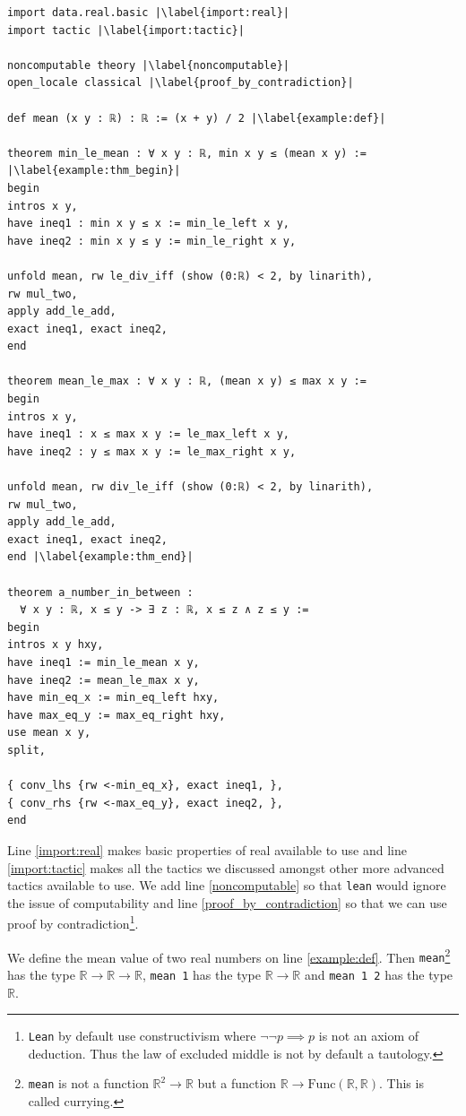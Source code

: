 \documentclass{report}
\theoremstyle{definition}
\begin{document}
\begin{verbatim}
import data.real.basic |\label{import:real}|
import tactic |\label{import:tactic}|
  
noncomputable theory |\label{noncomputable}|
open_locale classical |\label{proof_by_contradiction}|  

def mean (x y : ℝ) : ℝ := (x + y) / 2 |\label{example:def}|
  
theorem min_le_mean : ∀ x y : ℝ, min x y ≤ (mean x y) := |\label{example:thm_begin}|
begin
intros x y,
have ineq1 : min x y ≤ x := min_le_left x y,
have ineq2 : min x y ≤ y := min_le_right x y,
    
unfold mean, rw le_div_iff (show (0:ℝ) < 2, by linarith), 
rw mul_two, 
apply add_le_add, 
exact ineq1, exact ineq2, 
end
  
theorem mean_le_max : ∀ x y : ℝ, (mean x y) ≤ max x y :=
begin
intros x y,
have ineq1 : x ≤ max x y := le_max_left x y,
have ineq2 : y ≤ max x y := le_max_right x y,
  
unfold mean, rw div_le_iff (show (0:ℝ) < 2, by linarith), 
rw mul_two,
apply add_le_add,
exact ineq1, exact ineq2,
end |\label{example:thm_end}|
  
theorem a_number_in_between : 
  ∀ x y : ℝ, x ≤ y -> ∃ z : ℝ, x ≤ z ∧ z ≤ y :=
begin
intros x y hxy,
have ineq1 := min_le_mean x y,
have ineq2 := mean_le_max x y,
have min_eq_x := min_eq_left hxy,
have max_eq_y := max_eq_right hxy,
use mean x y,
split,
  
{ conv_lhs {rw <-min_eq_x}, exact ineq1, },
{ conv_rhs {rw <-max_eq_y}, exact ineq2, },
end

\end{verbatim}

Line \ref{import:real} makes basic properties of real available to use and line \ref{import:tactic} makes all the tactics we discussed amongst other more advanced tactics available to use. We add line \ref{noncomputable} so that {\tt \small lean} would ignore the issue of computability and line \ref{proof_by_contradiction} so that we can use proof by contradiction\footnote{{\tt \small Lean} by default use constructivism where $\neg\neg p\implies p$ is not an axiom of deduction. Thus the law of excluded middle is not by default a tautology.}. 

We define the mean value of two real numbers on line \ref{example:def}. Then {\tt \small mean}\footnote{{\tt \small mean} is not a function $\mathbb R^2\to\mathbb R$ but a function $\mathbb R\to\mathrm{Func}(\mathbb R,\mathbb R)$. This is called currying.} has the type $\mathbb R\to \mathbb R\to \mathbb R$, {\tt \small mean 1} has the type $\mathbb R\to \mathbb R$ and {\tt \small mean 1 2} has the type $\mathbb R$. 
\end{document}
